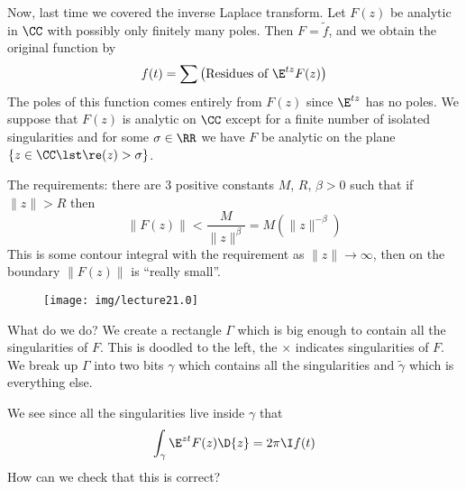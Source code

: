 Now, last time we covered the inverse Laplace transform. Let
$F(z)$ be analytic in $\CC$ with possibly only finitely many
poles. Then $F=\widetilde{f}$, and we obtain the original
function by
\begin{equation}
f(t)=\sum\left(\mbox{Residues of }\E^{tz}F(z)\right)
\end{equation}
The poles of this function comes entirely from $F(z)$ since
$\E^{tz}$ has no poles. We suppose that $F(z)$ is analytic on
$\CC$ except for a finite number of isolated singularities and
for some $\sigma\in\RR$ we have $F$ be analytic on the plane
$\{z\in\CC\lst\re(z)>\sigma\}$. 

The requirements: there are 3 positive constants $M$, $R$,
$\beta>0$ such that if $\|z\|>R$ then
\begin{equation}
\|F(z)\|<\frac{M}{\|z\|^{\beta}}=M(\|z\|^{-\beta})
\end{equation}
This is some contour integral with the requirement as
$\|z\|\to\infty$, then on the boundary $\|F(z)\|$ is ``really
small''. 

\begin{wrapfigure}{l}{1.45in}
\vspace{-24pt}
\begin{center}
\texttt{[image: img/lecture21.0]}
\end{center}
\vspace{-36pt}
\end{wrapfigure}
What do we do? We create a rectangle $\Gamma$ which is big enough
to contain all the singularities of $F$. This is doodled to the
left, the $\times$ indicates singularities of $F$.
We break up $\Gamma$ into two bits $\gamma$ which contains all
the singularities and $\widetilde{\gamma}$ which is everything
else. 

We see since all the singularities live inside $\gamma$ that
\begin{equation}
\int_{\gamma}\E^{zt}F(z)\D{z}=2\pi\I f(t)
\end{equation}
How can we check that this is correct?

